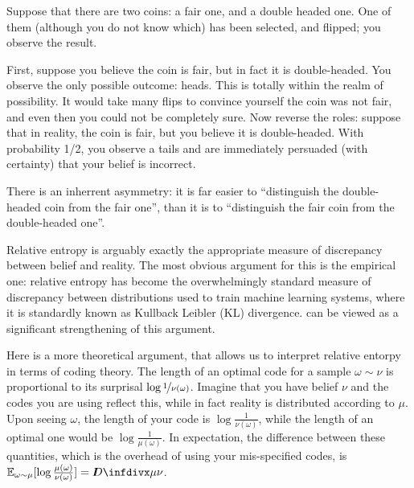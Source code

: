 \begin{example}
    Suppose that there are two coins: a fair one, and a double headed one. 
    One of them (although you do not know which) has been selected, and flipped; you observe the result. 

    First, suppose you believe the coin is fair, but in fact it is double-headed. 
    You observe the only possible outcome: heads. This is totally within the realm of possibility. It would take many flips to convince yourself the coin was not fair, and even then you could not be completely sure. 
    Now reverse the roles: suppose that in reality, the coin is fair, but you believe it is double-headed. With probability 1/2, you observe a tails and are immediately persuaded (with certainty) that your belief is incorrect. 

    There is an inherrent asymmetry: it is far easier to ``distinguish the double-headed coin from the fair one'', than it is to ``distinguish the fair coin from the double-headed one''.
\end{example}

Relative entropy is arguably exactly the appropriate measure of discrepancy between belief and reality. 
The most obvious argument for this is the empirical one:
relative entropy has become the overwhelmingly standard measure of discrepancy between distributions used to train machine learning systems, where it is standardly known as Kullback Leibler (KL) divergence.
 can be viewed as a significant strengthening of this argument.


Here is a more theoretical argument, that allows us to interpret relative entorpy in terms of coding theory. 
The length of an optimal code for a sample $\omega \sim \nu$ is proportional to its surprisal $\log \nicefrac1{\nu(\omega)}$.
Imagine that you have belief $\nu$ and the codes you are using reflect this, while in fact reality is distributed according to $\mu$.
Upon seeing $\omega$, the length of your code is $\log\frac{1}{\nu(\omega)}$, while the length of an optimal one would be $\log\frac{1}{\mu(\omega)}$. 
In expectation, the difference between these quantities,
    which is the overhead of using your mis-specified codes, is 
     $\Ex_{\omega \sim \mu}[ \log \frac{\mu(\omega)}{\nu(\omega)}] = \kldiv\mu\nu$.



